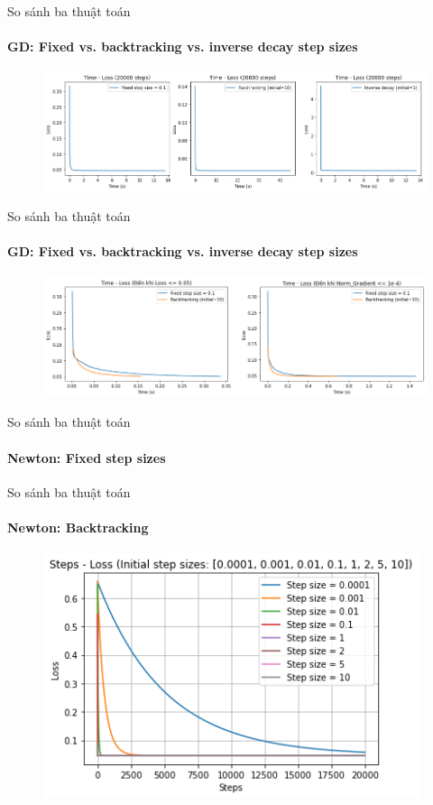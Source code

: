\documentclass[10pt]{beamer}
\theoremstyle{remark}
\theoremstyle{definition}
\begin{document}
\begin{frame}{So sánh ba thuật toán}
	\framesubtitle{GD: Fixed vs. backtracking vs. inverse decay step sizes}

	\begin{figure}[h!]
		\centering
		\includegraphics[width=12cm]{Thinh/10.png}
	\end{figure}

\end{frame}
\begin{frame}{So sánh ba thuật toán}
	\framesubtitle{GD: Fixed vs. backtracking vs. inverse decay step sizes}

	\begin{figure}[h!]
		\centering
		\includegraphics[width=12cm]{Thinh/11.png}
	\end{figure}
\end{frame}

\begin{frame}{So sánh ba thuật toán}
	\framesubtitle{Newton: Fixed step sizes}

\end{frame}

\begin{frame}{So sánh ba thuật toán}
	\framesubtitle{Newton: Backtracking}
	\begin{figure}[h!]
		\centering
		\includegraphics[width=11cm]{Thinh/12.png}
	\end{figure}

\end{frame}
\end{document}
